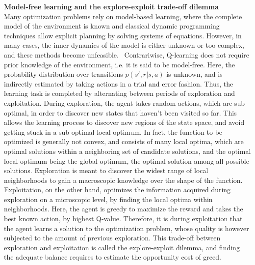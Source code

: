 \textbf{Model-free learning and the explore-exploit trade-off dilemma} \\
Many optimization problems rely on model-based learning, where the complete model of the environment is known and classical dynamic programming techniques allow explicit planning by solving systems of equations. However, in many cases, the inner dynamics of the model is either unknown or too complex, and these methods become unfeasible. \
Contrariwise, Q-learning does not require prior knowledge of the environment, i.e. it is said to be model-free. Here, the probability distribution over transitions $p(s',r|s,a)$ is unknown, and is indirectly estimated by taking actions in a trial and error fashion. Thus, the learning task is completed by alternating between periods of exploration and exploitation. During exploration, the agent takes random actions, which are sub-optimal, in order to discover new states that haven't been visited so far. This allows the learning process to discover new regions of the state space, and avoid getting stuck in a sub-optimal local optimum. In fact, the function to be optimized is generally not convex, and consists of many local optima, which are optimal solutions within a neighboring set of candidate solutions, and the optimal local optimum being the global optimum, the optimal solution among all possible solutions. Exploration is meant to discover the widest range of local neighborhoods to gain a macroscopic knowledge over the shape of the function. Exploitation, on the other hand, optimizes the information acquired during exploration on a microscopic level, by finding the local optima within neighborhoods. Here, the agent is greedy to maximize the reward and takes the best known action, by highest Q-value. Therefore, it is during exploitation that the agent learns a solution to the optimization problem, whose quality is however subjected to the amount of previous exploration. This trade-off between exploration and exploitation is called the explore-exploit dilemma, and finding the adequate balance requires to  estimate the opportunity cost of greed. \\

